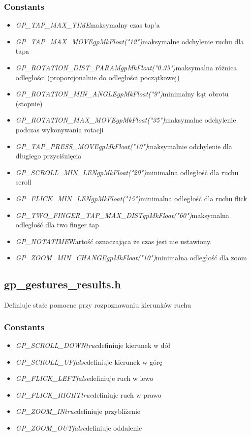 \subsubsection{Constants}
\begin{itemize} 
\item \textit{GP_TAP_MAX_TIME}\qquad maksymalny czas tap'a
\item \textit{GP_TAP_MAX_MOVE\quad gpMkFloat("12")}\qquad maksymalne odchylenie ruchu dla tapa
\item \textit{GP_ROTATION_DIST_PARAM\quad gpMkFloat("0.35")}\qquad maksymalna różnica odległości (proporcjonalnie do odległości początkowej)
\item \textit{GP_ROTATION_MIN_ANGLE\quad gpMkFloat("9")}\qquad minimalny kąt obrotu (stopnie)
\item \textit{GP_ROTATION_MAX_MOVE\quad gpMkFloat("35")}\qquad maksymalne odchylenie podczas wykonywania rotacji
\item \textit{GP_TAP_PRESS_MOVE\quad gpMkFloat("10")}\qquad maksymalnie odchylenie dla długiego przyciśnięcia
\item \textit{GP_SCROLL_MIN_LEN\quad gpMkFloat("20")}\qquad minimalna odległość dla ruchu scroll
\item \textit{GP_FLICK_MIN_LEN\quad gpMkFloat("15")}\qquad minimalna odległość dla ruchu flick
\item \textit{GP_TWO_FINGER_TAP_MAX_DIST\quad gpMkFloat("60")}\qquad maksymalna odległość dla two finger tap
\item \textit {GP_NOTATIME}\qquad Wartość oznaczająca że czas jest nie ustawiony. 
\item \textit{GP_ZOOM_MIN_CHANGE\quad gpMkFloat("10")}\qquad minimalna odległość dla zoom
\end{itemize}

\subsection{gp_gestures_results.h}
Definiuje stałe pomocne przy rozpoznawaniu kierunków ruchu
\subsubsection{Constants}
\begin{itemize}
\item \textit{GP_SCROLL_DOWN\quad true}\qquad definiuje kierunek w dół
\item \textit{GP_SCROLL_UP\quad false}\qquad definiuje kierunek w górę
\item \textit{GP_FLICK_LEFT\quad false}\qquad definiuje ruch w lewo
\item \textit{GP_FLICK_RIGHT\quad true}\qquad definiuje ruch w prawo
\item \textit{GP_ZOOM_IN\quad true}\qquad definiuje przybliżenie
\item \textit{GP_ZOOM_OUT\quad false}\qquad definiuje oddalenie
\end{itemize}

